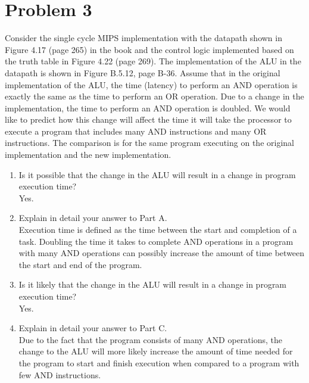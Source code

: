 \documentclass[10pt,letterpaper]{article}
\begin{document}
\section{Problem 3}
Consider the single cycle MIPS implementation with the datapath shown in Figure 4.17 (page 265) in the book and the control logic implemented based on the truth table in Figure 4.22 (page 269). The implementation of the ALU in the datapath is shown in Figure B.5.12, page B-36. Assume that in the original implementation of the ALU, the time (latency) to perform an AND operation is exactly the same as the time to perform an OR operation. Due to a change in the implementation, the time to perform an AND operation is doubled. We would like to predict how this change will affect the time it will take the processor to execute a program that includes many AND instructions and many OR instructions. The comparison is for the same program executing on the original implementation and the new implementation.
\begin{enumerate}[label=\Alph*)]
\item Is it possible that the change in the ALU will result in a change in program execution time?\\
Yes.
\item Explain in detail your answer to Part A.\\
Execution time is defined as the time between the start and completion of a task. Doubling the time it takes to complete AND operations in a program with many AND operations can possibly increase the amount of time between the start and end of the program. 
\item Is it likely that the change in the ALU will result in a change in program execution time?\\
Yes.
\item Explain in detail your answer to Part C.\\
Due to the fact that the program consists of many AND operations, the change to the ALU will more likely increase the amount of time needed for the program to start and finish execution when compared to a program with few AND instructions.
\end{enumerate}
\pagebreak

\end{document}
